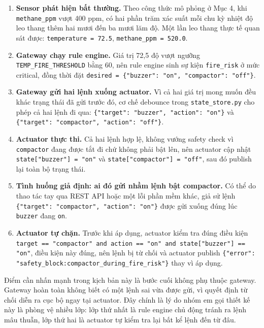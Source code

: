 \documentclass[12pt,a4paper]{article}
\begin{document}
\begin{enumerate}[nosep]
    \item \textbf{Sensor phát hiện bất thường.} Theo công thức mô phỏng ở Mục 4, khi \texttt{methane\_ppm} vượt 400 ppm, có hai phần trăm xác suất mỗi chu kỳ nhiệt độ leo thang thêm hai mươi đến ba mươi lăm độ. Một lần leo thang thực tế quan sát được: \texttt{temperature = 72.5}, \texttt{methane\_ppm = 520.0}.
    \item \textbf{Gateway chạy rule engine.} Giá trị 72,5 độ vượt ngưỡng \texttt{TEMP\_FIRE\_THRESHOLD} bằng 60, nên rule engine sinh sự kiện \texttt{fire\_risk} ở mức critical, đồng thời đặt \texttt{desired = \{"buzzer": "on", "compactor": "off"\}}.
    \item \textbf{Gateway gửi hai lệnh xuống actuator.} Vì cả hai giá trị mong muốn đều khác trạng thái đã gửi trước đó, cơ chế debounce trong \texttt{state\_store.py} cho phép cả hai lệnh đi qua: \texttt{\{"target": "buzzer", "action": "on"\}} và \texttt{\{"target": "compactor", "action": "off"\}}.
    \item \textbf{Actuator thực thi.} Cả hai lệnh hợp lệ, không vướng safety check vì \texttt{compactor} đang được tắt đi chứ không phải bật lên, nên actuator cập nhật \texttt{state["buzzer"] = "on"} và \texttt{state["compactor"] = "off"}, sau đó publish lại toàn bộ trạng thái.
    \item \textbf{Tình huống giả định: ai đó gửi nhầm lệnh bật compactor.} Có thể do thao tác tay qua REST API hoặc một lỗi phần mềm khác, giả sử lệnh \texttt{\{"target": "compactor", "action": "on"\}} được gửi xuống đúng lúc \texttt{buzzer} đang \texttt{on}.
    \item \textbf{Actuator tự chặn.} Trước khi áp dụng, actuator kiểm tra đúng điều kiện \texttt{target == "compactor" and action == "on" and state["buzzer"] == "on"}, điều kiện này đúng, nên lệnh bị từ chối và actuator publish \texttt{\{"error": "safety\_block:compactor\_during\_fire\_risk"\}} thay vì áp dụng.
\end{enumerate}

Điểm cần nhấn mạnh trong kịch bản này là bước cuối không phụ thuộc gateway. Gateway hoàn toàn không biết có một lệnh sai vừa được gửi, vì quyết định từ chối diễn ra cục bộ ngay tại actuator. Đây chính là lý do nhóm em gọi thiết kế này là phòng vệ nhiều lớp: lớp thứ nhất là rule engine chủ động tránh ra lệnh mâu thuẫn, lớp thứ hai là actuator tự kiểm tra lại bất kể lệnh đến từ đâu.
\end{document}
